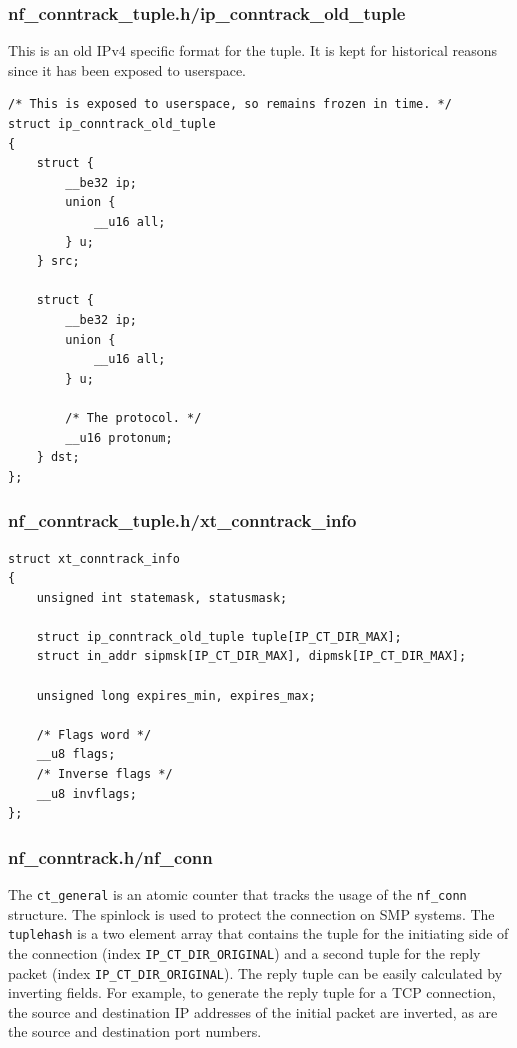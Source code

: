 \documentclass[a4paper,10pt]{article}
\newcommand{\code}[1]{\texttt{{#1}}}
\begin{document}
\subsubsection{nf\_conntrack\_tuple.h/ip\_conntrack\_old\_tuple}

This is an old IPv4 specific format for the tuple. It is kept for
historical reasons since it has been exposed to userspace.

\begin{lstlisting}
/* This is exposed to userspace, so remains frozen in time. */
struct ip_conntrack_old_tuple
{
	struct {
		__be32 ip;
		union {
			__u16 all;
		} u;
	} src;

	struct {
		__be32 ip;
		union {
			__u16 all;
		} u;

		/* The protocol. */
		__u16 protonum;
	} dst;
};
\end{lstlisting}

\subsubsection{nf\_conntrack\_tuple.h/xt\_conntrack\_info}

\begin{lstlisting}
struct xt_conntrack_info
{
	unsigned int statemask, statusmask;

	struct ip_conntrack_old_tuple tuple[IP_CT_DIR_MAX];
	struct in_addr sipmsk[IP_CT_DIR_MAX], dipmsk[IP_CT_DIR_MAX];

	unsigned long expires_min, expires_max;

	/* Flags word */
	__u8 flags;
	/* Inverse flags */
	__u8 invflags;
};
\end{lstlisting}



\subsubsection{nf\_conntrack.h/nf\_conn}\label{nf_conn}

The \code{ct\_general} is an atomic counter that tracks the usage of
the \code{nf\_conn} structure. The spinlock is used to protect the
connection on SMP systems. The \verb|tuplehash| is a two element array
that contains the tuple for the initiating side of the connection
(index \verb|IP_CT_DIR_ORIGINAL|) and a second tuple for the
reply packet (index \verb|IP_CT_DIR_ORIGINAL|). The reply tuple
can be easily calculated by inverting fields. For example, to generate the reply tuple for a TCP
connection,  the source and destination IP
addresses of the initial packet are inverted, as are the source and
destination port numbers\cite{tcpip-illustrated}.
\end{document}
